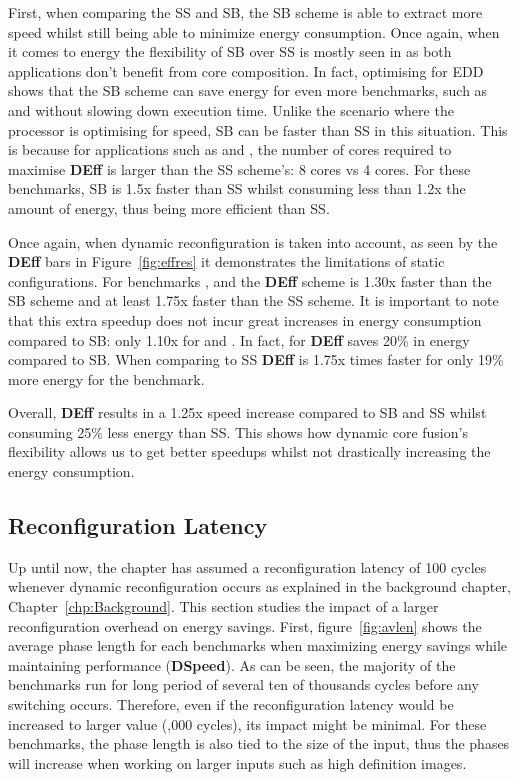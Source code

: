 
First, when comparing the SS and SB, the SB scheme is able to extract more speed whilst still being able to minimize energy consumption.
Once again, when it comes to energy the flexibility of SB over SS is mostly seen in   as both applications don't benefit from core composition.
In fact, optimising for EDD shows that the SB scheme can save energy for even more benchmarks, such as  and  without slowing down execution time.
Unlike the scenario where the processor is optimising for speed, SB can be faster than SS in this situation.
This is because for applications such as  and , the number of cores required to maximise \textbf{DEff} is larger than the SS scheme's: 8 cores vs 4 cores.
For these benchmarks, SB is 1.5x faster than SS whilst consuming less than 1.2x the amount of energy, thus being more efficient than SS.

Once again, when dynamic reconfiguration is taken into account, as seen by the \textbf{DEff} bars in Figure~\ref{fig:effres} it demonstrates the limitations of static configurations.
For benchmarks ,  and  the \textbf{DEff} scheme is 1.30x faster than the SB scheme and at least 1.75x faster than the SS scheme.
It is important to note that this extra speedup does not incur great increases in energy consumption compared to SB: only 1.10x for  and .
In fact, for  \textbf{DEff} saves 20\% in energy compared to SB.
When comparing to SS \textbf{DEff} is 1.75x times faster for only 19\% more energy for the  benchmark.

Overall, \textbf{DEff} results in a 1.25x speed increase compared to SB and SS whilst consuming 25\% less energy than SS.
This shows how dynamic core fusion's flexibility allows us to get better speedups whilst not drastically increasing the energy consumption.

\subsection{Reconfiguration Latency} \label{sec:reconfoverhead}

Up until now, the chapter has assumed a reconfiguration latency of 100 cycles whenever dynamic reconfiguration occurs as explained in the background chapter, Chapter~\ref{chp:Background}.
This section studies the impact of a larger reconfiguration overhead on energy savings.
First, figure~\ref{fig:avlen} shows the average phase length for each benchmarks when maximizing energy savings while maintaining performance (\textbf{DSpeed}).
As can be seen, the majority of the benchmarks run for long period of several ten of thousands cycles before any switching occurs.
Therefore, even if the reconfiguration latency would be increased to larger value (,000 cycles), its impact might be minimal.
For these benchmarks, the phase length is also tied to the size of the input, thus the phases will increase when working on larger inputs such as high definition images.

